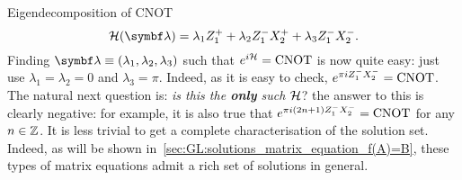 \begin{examplebox}[label={ex:GL:eigendecomposition_cnot}]{Eigendecomposition of CNOT}
\begin{equation}
    \calH(\bs\lambda) = \lambda_1 Z_1^+ + \lambda_2 Z_1^- X_2^+ + \lambda_3 Z_1^- X_2^-.
\end{equation}
Finding $\bs\lambda\equiv(\lambda_1,\lambda_2,\lambda_3)$ such that $e^{i{\mathcal{H}}}=\operatorname{CNOT}$ is now quite easy: just use $\lambda_1=\lambda_2=0$ and $\lambda_3=\pi$. Indeed, as it is easy to check, $e^{\pi i Z_1^- X_2^-} = \operatorname{CNOT}$.
The natural next question is: \emph{is this the \textbf{only} such ${\mathcal{H}}$}? the answer to this is clearly negative: for example, it is also true that $e^{\pi i (2n+1) Z_1^- X_2^-}=\operatorname{CNOT}$ for any $n\in\mathbb{Z}$.
It is less trivial to get a complete characterisation of the solution set.
Indeed, as will be shown in~\cref{sec:GL:solutions_matrix_equation_f(A)=B}, these types of matrix equations admit a rich set of solutions in general.
\end{examplebox}

